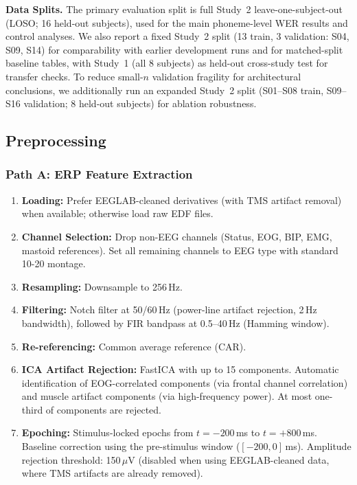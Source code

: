 \documentclass[11pt,a4paper]{article}
\begin{document}
\textbf{Data Splits.} The primary evaluation split is full Study~2
leave-one-subject-out (LOSO; 16 held-out subjects), used for the main
phoneme-level WER results and control analyses. We also report a fixed Study~2
split (13 train, 3 validation: S04, S09, S14) for comparability with earlier
development runs and for matched-split baseline tables, with Study~1 (all 8
subjects) as held-out cross-study test for transfer checks. To reduce small-$n$
validation fragility for architectural conclusions, we additionally run an
expanded Study~2 split (S01--S08 train, S09--S16 validation; 8 held-out
subjects) for ablation robustness.

\subsection{Preprocessing}

\subsubsection{Path A: ERP Feature Extraction}

\begin{enumerate}
  \item \textbf{Loading:} Prefer EEGLAB-cleaned derivatives (with TMS artifact
    removal) when available; otherwise load raw EDF files.
  \item \textbf{Channel Selection:} Drop non-EEG channels (Status, EOG, BIP,
    EMG, mastoid references). Set all remaining channels to EEG type with
    standard 10-20 montage.
  \item \textbf{Resampling:} Downsample to 256\,Hz.
  \item \textbf{Filtering:} Notch filter at 50/60\,Hz (power-line artifact
    rejection, 2\,Hz bandwidth), followed by FIR bandpass at 0.5--40\,Hz
    (Hamming window).
  \item \textbf{Re-referencing:} Common average reference (CAR).
  \item \textbf{ICA Artifact Rejection:} FastICA with up to 15 components.
    Automatic identification of EOG-correlated components (via frontal channel
    correlation) and muscle artifact components (via high-frequency power). At
    most one-third of components are rejected.
  \item \textbf{Epoching:} Stimulus-locked epochs from $t = -200$\,ms to
    $t = +800$\,ms. Baseline correction using the pre-stimulus window
    ($[-200, 0]$\,ms). Amplitude rejection threshold: 150\,$\mu$V (disabled
    when using EEGLAB-cleaned data, where TMS artifacts are already removed).
\end{enumerate}
\end{document}
